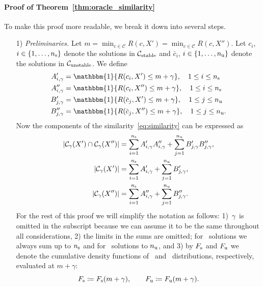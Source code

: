\paragraph{Proof of Theorem~\ref{thm:oracle_similarity}}
To make this proof more readable, we break it down into several
steps.
\begin{itemize}
  \item[1)] {\em Preliminaries.}
    Let $m=\min_{c \in \mathcal{C}} R(c, X')=\min_{c \in \mathcal{C}} R(c, X'')$. Let
    $c_i$, $i\in\{1,\ldots,n_\text{s}\}$ denote the solutions in $\mathcal{C}_\text{stable}$ and
    $\bar c_i$, $i\in\{1,\ldots,n_\text{u}\}$ denote the solutions in $\mathcal{C}_\text{unstable}$. We define
    \begin{align*}
      A'_{i, \gamma} &= \mathbbm{1}\{R(c_i,X') \le m+\gamma\}, \quad 1 \le i \le \g \\
      A''_{i, \gamma} &= \mathbbm{1}\{R(c_i,X'') \le m+\gamma\}, \quad 1 \le i \le \g \\
      B'_{j, \gamma} &= \mathbbm{1}\{R(\bar c_j,X') \le m+\gamma\}, \quad 1 \le j \le \b \\
      B''_{j, \gamma} &= \mathbbm{1}\{R(\bar c_j,X'') \le m+\gamma\}, \quad 1 \le j \le \b.
    \end{align*}
    Now the components of the similarity~\eqref{eq:similarity} can be
    expressed as
    \begin{align*}
      |\mathcal{C}_\gamma(X')\cap \mathcal{C}_\gamma(X'')|
        &= \sum_{i = 1}^{n_\text{s}} A'_{i,\gamma} A''_{i,\gamma} +
          \sum_{j = 1}^{n_\text{u}} B'_{j,\gamma} B''_{j,\gamma}, \\
      |\mathcal{C}_\gamma(X')|
        &= \sum_{i = 1}^{n_\text{s}} A'_{i,\gamma} + \sum_{j = 1}^{n_\text{u}} B'_{j,\gamma}, \\
      |\mathcal{C}_\gamma(X'')|
        &= \sum_{i = 1}^{n_\text{s}} A''_{i,\gamma} + \sum_{j = 1}^{n_\text{u}} B''_{j,\gamma}.
    \end{align*}
    For the rest of this proof we will simplify the notation as follows:
    1)~$\gamma$~is omitted in the subscript because we can assume it to be
    the same throughout all considerations, 2) the limits in the sums are
    omitted; for \good\ solutions we
    always sum up to $n_\text{s}$ and for \bad\ solutions to $n_\text{u}$, and 3) by $F_\text{s}$ and
    $F_\text{u}$ we denote the cumulative density functions of \good\ and \bad\
    distributions, respectively, evaluated at $m+\gamma$:
    \begin{equation}
      \FG \coloneqq \FG(m + \gamma), \qquad \FB \coloneqq \FB(m + \gamma).

\end{equation}
\end{itemize}
